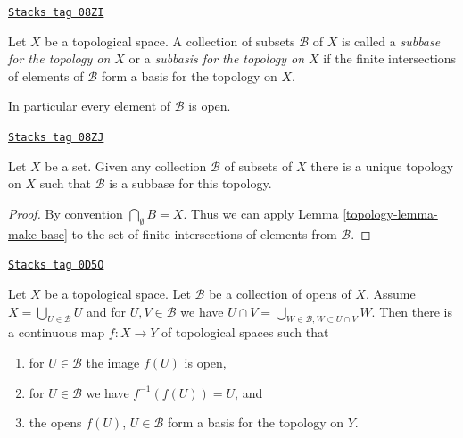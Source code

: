 \begin{definition}[Subbase]
\label{topology-definition-subbase}
\href{https://stacks.math.columbia.edu/tag/08ZI}{\texttt{Stacks tag 08ZI}}

Let $X$ be a topological space. A collection of subsets $\mathcal{B}$ of $X$
is called a {\it subbase for the topology on $X$} or a {\it subbasis for the
topology on $X$} if the finite intersections of
elements of $\mathcal{B}$ form a basis for the topology on $X$.
\end{definition}

In particular every element of $\mathcal{B}$ is open.

\begin{lemma}[Subbase]
\label{topology-lemma-subbase}
\href{https://stacks.math.columbia.edu/tag/08ZJ}{\texttt{Stacks tag 08ZJ}}

Let $X$ be a set. Given any collection $\mathcal{B}$ of subsets of $X$
there is a unique topology on $X$ such that $\mathcal{B}$ is a subbase
for this topology.
\end{lemma}

\begin{proof}

By convention $\bigcap_\emptyset B = X $. Thus we can apply Lemma
\ref{topology-lemma-make-base} to the set of finite intersections of elements
from $\mathcal B$.
\end{proof}

\begin{lemma}
\label{topology-lemma-create-map-from-subcollection}
\href{https://stacks.math.columbia.edu/tag/0D5Q}{\texttt{Stacks tag 0D5Q}}

Let $X$ be a topological space. Let $\mathcal{B}$ be a collection
of opens of $X$. Assume $X = \bigcup_{U \in \mathcal{B}} U$ and
for $U, V \in \mathcal{B}$ we have
$U \cap V = \bigcup_{W \in \mathcal{B}, W \subset U \cap V} W$.
Then there is a continuous map $f : X \to Y$ of topological spaces
such that
\begin{enumerate}
\item for $U \in \mathcal{B}$ the image $f(U)$ is open,
\item for $U \in \mathcal{B}$ we have $f^{-1}(f(U)) = U$, and
\item the opens $f(U)$, $U \in \mathcal{B}$
form a basis for the topology on $Y$.
\end{enumerate}
\end{lemma}

